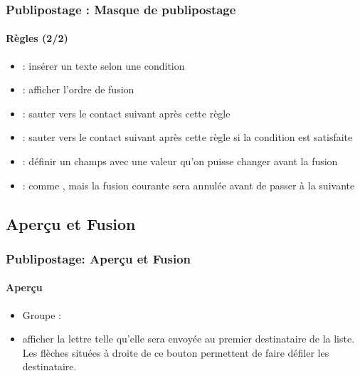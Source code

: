 \documentclass[xcolor=table]{beamer}
\begin{document}
\begin{frame}
\frametitle{Publipostage : Masque de publipostage}
\framesubtitle{Règles (2/2)}

\begin{minipage}{0.63\textwidth}
	\begin{itemize}
		\item {} : insérer un texte selon une condition
		\item {} : afficher l'ordre de fusion
		\item {} : sauter vers le contact suivant après cette règle
		\item {} : sauter vers le contact suivant après cette règle si la condition est satisfaite
		\item {} : définir un champs avec une valeur qu'on puisse changer avant la fusion
		\item {} : comme , mais la fusion courante sera annulée avant de passer à la suivante
	\end{itemize}
\end{minipage}
\begin{minipage}{0.36\textwidth}
	
	
	
\end{minipage}

\end{frame}

\subsection{Aperçu et Fusion}

\begin{frame}
\frametitle{Publipostage: Aperçu et Fusion}
\framesubtitle{Aperçu}

\begin{minipage}{0.74\textwidth}
	\begin{itemize}
		\item Groupe : 
		\item afficher la lettre telle qu'elle sera envoyée au premier destinataire de la liste. Les flèches situées à droite de ce bouton permettent de faire défiler les destinataire.
	\end{itemize}
\end{minipage}
\begin{minipage}{0.25\textwidth}
\end{minipage}

\vfill

\hfill
{}

\end{frame}
\end{document}
